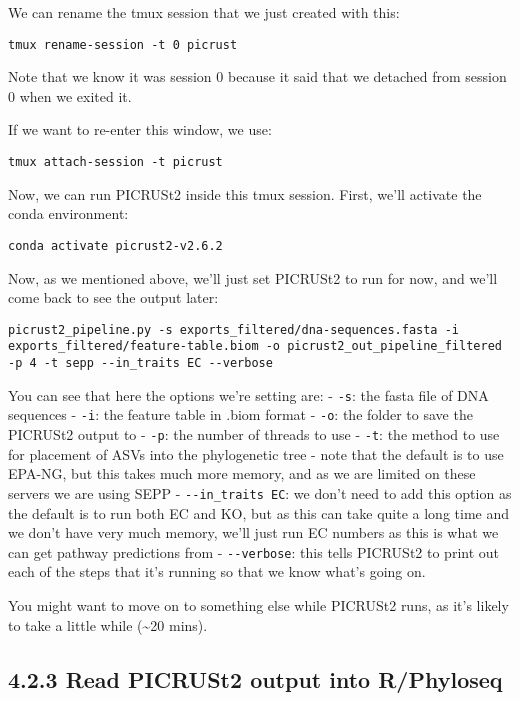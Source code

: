 \documentclass[
]{book}
\begin{document}
We can rename the tmux session that we just created with this:

\begin{verbatim}
tmux rename-session -t 0 picrust
\end{verbatim}

Note that we know it was session 0 because it said that we detached from session 0 when we exited it.

If we want to re-enter this window, we use:

\begin{verbatim}
tmux attach-session -t picrust
\end{verbatim}

Now, we can run PICRUSt2 inside this tmux session. First, we'll activate the conda environment:

\begin{verbatim}
conda activate picrust2-v2.6.2
\end{verbatim}

Now, as we mentioned above, we'll just set PICRUSt2 to run for now, and we'll come back to see the output later:

\begin{verbatim}
picrust2_pipeline.py -s exports_filtered/dna-sequences.fasta -i exports_filtered/feature-table.biom -o picrust2_out_pipeline_filtered -p 4 -t sepp --in_traits EC --verbose
\end{verbatim}

You can see that here the options we're setting are:
- \texttt{-s}: the fasta file of DNA sequences
- \texttt{-i}: the feature table in .biom format
- \texttt{-o}: the folder to save the PICRUSt2 output to
- \texttt{-p}: the number of threads to use
- \texttt{-t}: the method to use for placement of ASVs into the phylogenetic tree - note that the default is to use EPA-NG, but this takes much more memory, and as we are limited on these servers we are using SEPP
- \texttt{-\/-in\_traits\ EC}: we don't need to add this option as the default is to run both EC and KO, but as this can take quite a long time and we don't have very much memory, we'll just run EC numbers as this is what we can get pathway predictions from
- \texttt{-\/-verbose}: this tells PICRUSt2 to print out each of the steps that it's running so that we know what's going on.

You might want to move on to something else while PICRUSt2 runs, as it's likely to take a little while (\textasciitilde20 mins).

\subsection{4.2.3 Read PICRUSt2 output into R/Phyloseq}\label{read-picrust2-output-into-rphyloseq}
\end{document}
